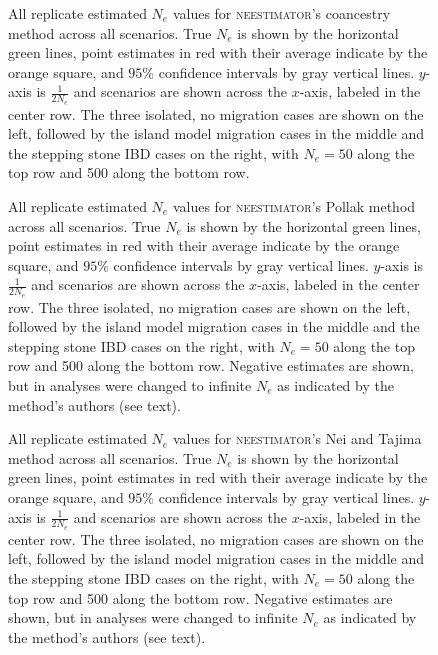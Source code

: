 \begin{landscape}
\begin{figure}[h!]
\centering
{}
\caption[All replicate estimated $N_e$ values for \textsc{neestimator}'s coancestry method across all scenarios.]{All replicate estimated $N_e$ values for \textsc{neestimator}'s coancestry method across all scenarios. True $N_e$ is shown by the horizontal green lines, point estimates in red with their average indicate by the orange square, and $95\%$ confidence intervals by gray vertical lines. $y$-axis is $\frac{1}{2 N_e}$ and scenarios are shown across the $x$-axis, labeled in the center row. The three isolated, no migration cases are shown on the left, followed by the island model migration cases in the middle and the stepping stone IBD cases on the right, with $N_e = 50$ along the top row and 500 along the bottom row.}
\label{fig:supp_}
\end{figure}


\begin{figure}[h!]
\centering
{}
\caption[All replicate estimated $N_e$ values for \textsc{neestimator}'s Pollak method across all scenarios.]{All replicate estimated $N_e$ values for \textsc{neestimator}'s Pollak method across all scenarios. True $N_e$ is shown by the horizontal green lines, point estimates in red with their average indicate by the orange square, and $95\%$ confidence intervals by gray vertical lines. $y$-axis is $\frac{1}{2 N_e}$ and scenarios are shown across the $x$-axis, labeled in the center row. The three isolated, no migration cases are shown on the left, followed by the island model migration cases in the middle and the stepping stone IBD cases on the right, with $N_e = 50$ along the top row and 500 along the bottom row. Negative estimates are shown, but in analyses were changed to infinite $N_e$ as indicated by the method's authors (see text).}
\label{fig:supp_}
\end{figure}


\begin{figure}[h!]
\centering
{}
\caption[All replicate estimated $N_e$ values for \textsc{neestimator}'s Nei and Tajima method across all scenarios.]{All replicate estimated $N_e$ values for \textsc{neestimator}'s Nei and Tajima method across all scenarios. True $N_e$ is shown by the horizontal green lines, point estimates in red with their average indicate by the orange square, and $95\%$ confidence intervals by gray vertical lines. $y$-axis is $\frac{1}{2 N_e}$ and scenarios are shown across the $x$-axis, labeled in the center row. The three isolated, no migration cases are shown on the left, followed by the island model migration cases in the middle and the stepping stone IBD cases on the right, with $N_e = 50$ along the top row and 500 along the bottom row. Negative estimates are shown, but in analyses were changed to infinite $N_e$ as indicated by the method's authors (see text).}
\label{fig:supp_}
\end{figure}



\end{landscape}
